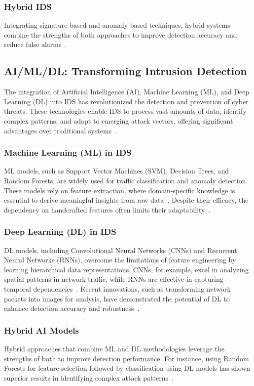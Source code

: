 \subsubsection{Hybrid IDS} Integrating signature-based and anomaly-based techniques, hybrid systems combine the strengths of both approaches to improve detection accuracy and reduce false alarms~\cite{Rele2023}.

\subsection{AI/ML/DL: Transforming Intrusion Detection} 
The integration of Artificial Intelligence (AI), Machine Learning (ML), and Deep Learning (DL) into IDS has revolutionized the detection and prevention of cyber threats. These technologies enable IDS to process vast amounts of data, identify complex patterns, and adapt to emerging attack vectors, offering significant advantages over traditional systems~\cite{Gutierrez2023}.

\subsubsection{Machine Learning (ML) in IDS} ML models, such as Support Vector Machines (SVM), Decision Trees, and Random Forests, are widely used for traffic classification and anomaly detection. These models rely on feature extraction, where domain-specific knowledge is essential to derive meaningful insights from raw data~\cite{Amanoul2021}. Despite their efficacy, the dependency on handcrafted features often limits their adaptability~\cite{Meena2021}.

\subsubsection{Deep Learning (DL) in IDS} DL models, including Convolutional Neural Networks (CNNs) and Recurrent Neural Networks (RNNs), overcome the limitations of feature engineering by learning hierarchical data representations. CNNs, for example, excel in analyzing spatial patterns in network traffic, while RNNs are effective in capturing temporal dependencies~\cite{vinayakumar2019deep}. Recent innovations, such as transforming network packets into images for analysis, have demonstrated the potential of DL to enhance detection accuracy and robustness~\cite{Ghadermazi2024}.

\subsubsection{Hybrid AI Models} Hybrid approaches that combine ML and DL methodologies leverage the strengths of both to improve detection performance. For instance, using Random Forests for feature selection followed by classification using DL models has shown superior results in identifying complex attack patterns~\cite{Rele2023}.

